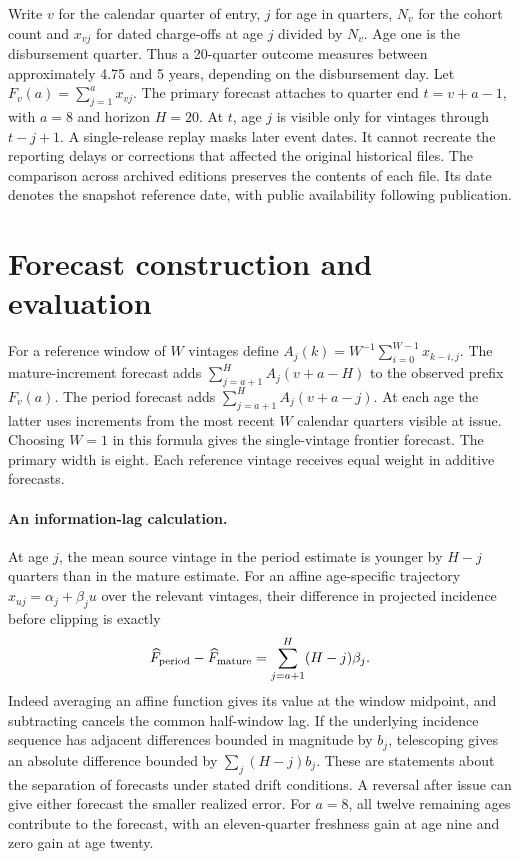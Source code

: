 \documentclass[11pt]{article}
\begin{document}
Write $v$ for the calendar quarter of entry, $j$ for age in quarters, $N_v$ for the cohort count and $x_{vj}$ for dated charge-offs at age $j$ divided by $N_v$. Age one is the disbursement quarter. Thus a 20-quarter outcome measures between approximately 4.75 and 5 years, depending on the disbursement day. Let $F_v(a)=\sum_{j=1}^a x_{vj}$. The primary forecast attaches to quarter end $t=v+a-1$, with $a=8$ and horizon $H=20$. At $t$, age $j$ is visible only for vintages through $t-j+1$. A single-release replay masks later event dates. It cannot recreate the reporting delays or corrections that affected the original historical files. The comparison across archived editions preserves the contents of each file. Its date denotes the snapshot reference date, with public availability following publication.

\section{Forecast construction and evaluation}
For a reference window of $W$ vintages define $A_j(k)=W^{-1}\sum_{i=0}^{W-1}x_{k-i,j}$. The mature-increment forecast adds $\sum_{j=a+1}^H A_j(v+a-H)$ to the observed prefix $F_v(a)$. The period forecast adds $\sum_{j=a+1}^H A_j(v+a-j)$. At each age the latter uses increments from the most recent $W$ calendar quarters visible at issue. Choosing $W=1$ in this formula gives the single-vintage frontier forecast. The primary width is eight. Each reference vintage receives equal weight in additive forecasts.

\paragraph{An information-lag calculation.}
At age $j$, the mean source vintage in the period estimate is younger by $H-j$ quarters than in the mature estimate. For an affine age-specific trajectory $x_{uj}=\alpha_j+\beta_j u$ over the relevant vintages, their difference in projected incidence before clipping is exactly
\[
 \widehat F_{\rm period}-\widehat F_{\rm mature}
     = \sum_{j=a+1}^{H}(H-j)\beta_j .
\]
Indeed averaging an affine function gives its value at the window midpoint, and subtracting cancels the common half-window lag. If the underlying incidence sequence has adjacent differences bounded in magnitude by $b_j$, telescoping gives an absolute difference bounded by $\sum_j (H-j)b_j$. These are statements about the separation of forecasts under stated drift conditions. A reversal after issue can give either forecast the smaller realized error. For $a=8$, all twelve remaining ages contribute to the forecast, with an eleven-quarter freshness gain at age nine and zero gain at age twenty.
\end{document}
